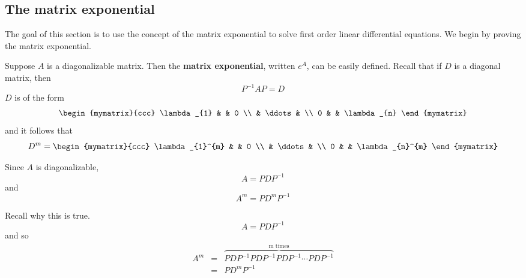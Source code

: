 
\subsection{The matrix exponential}

The goal of this section is to use the concept of the matrix exponential to solve first order linear differential equations. We begin by proving the matrix exponential. 

Suppose $A$ is a diagonalizable matrix. Then the {\bf matrix exponential}, written $e^{A}$, can be easily defined. 
Recall that if $D$ is a diagonal matrix, then  
\begin{equation*}
P^{-1}AP=D
\end{equation*}
$D$ is of the form 
\begin{equation}
\begin{mymatrix}{ccc}
\lambda _{1} &  & 0 \\ 
& \ddots &  \\ 
0 &  & \lambda _{n}
\end{mymatrix}  \label{diagonal-matrix}
\end{equation}
and it follows that 
\begin{equation*}
D^{m}=\begin{mymatrix}{ccc}
\lambda _{1}^{m} &  & 0 \\ 
& \ddots &  \\ 
0 &  & \lambda _{n}^{m}
\end{mymatrix}
\end{equation*}

Since $A$ is diagonalizable, 
\begin{equation*}
A=PDP^{-1}
\end{equation*}
and
\begin{equation*}
A^{m}=PD^{m}P^{-1}
\end{equation*}

Recall why this is true. 
\begin{equation*}
A=PDP^{-1}
\end{equation*}
and so 
\begin{eqnarray*}
A^{m} &=&\overset{
\text{m times}}{\overbrace{PDP^{-1}PDP^{-1}PDP^{-1}\cdots PDP^{-1}}} \\
&=&PD^{m}P^{-1}
\end{eqnarray*}


